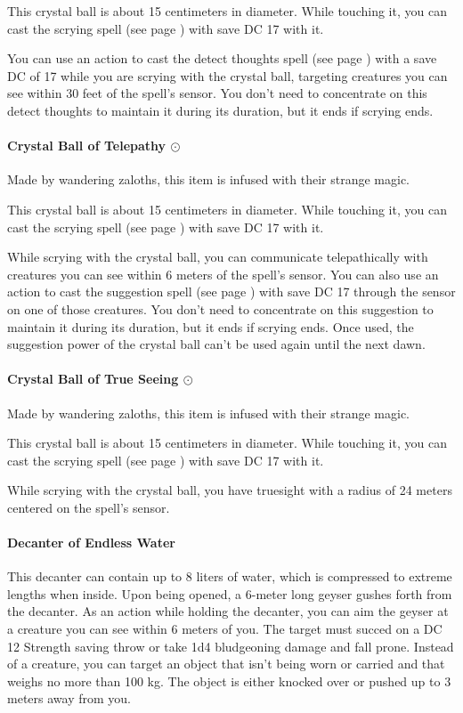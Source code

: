         This crystal ball is about 15 centimeters in diameter.
        While touching it, you can cast the scrying spell (see page \pageref{spell::scrying}) with save DC 17 with it.

        You can use an action to cast the detect thoughts spell (see page \pageref{spell::detectthoughts}) with a save DC of 17 while you are scrying with the crystal ball, targeting creatures you can see within 30 feet of the spell's sensor.
        You don't need to concentrate on this detect thoughts to maintain it during its duration, but it ends if scrying ends.
    \paragraph{Crystal Ball of Telepathy $\odot$}
        Made by wandering zaloths, this item is infused with their strange magic.

        This crystal ball is about 15 centimeters in diameter.
        While touching it, you can cast the scrying spell (see page \pageref{spell::scrying}) with save DC 17 with it.

        While scrying with the crystal ball, you can communicate telepathically with creatures you can see within 6 meters of the spell's sensor.
        You can also use an action to cast the suggestion spell (see page \pageref{spell::suggestion}) with save DC 17 through the sensor on one of those creatures.
        You don't need to concentrate on this suggestion to maintain it during its duration, but it ends if scrying ends.
        Once used, the suggestion power of the crystal ball can't be used again until the next dawn.
    \paragraph{Crystal Ball of True Seeing $\odot$}
        Made by wandering zaloths, this item is infused with their strange magic.

        This crystal ball is about 15 centimeters in diameter.
        While touching it, you can cast the scrying spell (see page \pageref{spell::scrying}) with save DC 17 with it.

        While scrying with the crystal ball, you have truesight with a radius of 24 meters centered on the spell's sensor.
    \paragraph{Decanter of Endless Water}
        This decanter can contain up to 8 liters of water, which is compressed to extreme lengths when inside.
        Upon being opened, a 6-meter long geyser gushes forth from the decanter.
        As an action while holding the decanter, you can aim the geyser at a creature you can see within 6 meters of you.
        The target must succed on a DC 12 Strength saving throw or take 1d4 bludgeoning damage and fall prone.
        Instead of a creature, you can target an object that isn't being worn or carried and that weighs no more than 100 kg.
        The object is either knocked over or pushed up to 3 meters away from you.

